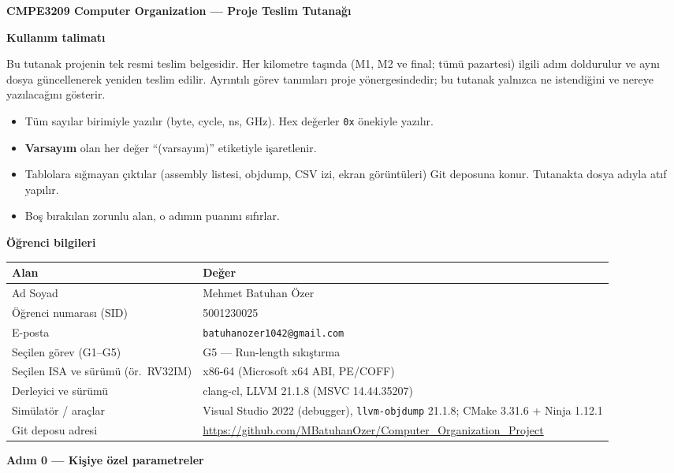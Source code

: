 \documentclass[11pt,a4paper]{article}
\newcommand{\tl}{\texttt}
\newcommand{\hd}[1]{\cellcolor{hdr}#1}
\begin{document}
\begin{center}
\textbf{CMPE3209 Computer Organization --- Proje Teslim Tutanağı}
\end{center}

\textbf{Kullanım talimatı}

Bu tutanak projenin tek resmi teslim belgesidir. Her kilometre taşında (M1, M2 ve final; tümü
pazartesi) ilgili adım doldurulur ve aynı dosya güncellenerek yeniden teslim edilir. Ayrıntılı
görev tanımları proje yönergesindedir; bu tutanak yalnızca ne istendiğini ve nereye yazılacağını
gösterir.

\begin{itemize}[leftmargin=2em,itemsep=1pt,topsep=2pt]
\item Tüm sayılar birimiyle yazılır (byte, cycle, ns, GHz). Hex değerler \tl{0x} önekiyle yazılır.
\item \textbf{Varsayım} olan her değer ``(varsayım)'' etiketiyle işaretlenir.
\item Tablolara sığmayan çıktılar (assembly listesi, objdump, CSV izi, ekran görüntüleri) Git
deposuna konur. Tutanakta dosya adıyla atıf yapılır.
\item Boş bırakılan zorunlu alan, o adımın puanını sıfırlar.
\end{itemize}

\textbf{Öğrenci bilgileri}

\begin{longtable}{|p{10.2cm}|p{5.3cm}|}
\hline
\hd{Alan} & \hd{Değer}\\
\hline
Ad Soyad & Mehmet Batuhan Özer\\
\hline
Öğrenci numarası (SID) & 5001230025\\
\hline
E-posta & \tl{batuhanozer1042@gmail.com}\\
\hline
Seçilen görev (G1--G5) & G5 --- Run-length sıkıştırma\\
\hline
Seçilen ISA ve sürümü (ör.\ RV32IM) & x86-64 (Microsoft x64 ABI, PE/COFF)\\
\hline
Derleyici ve sürümü & clang-cl, LLVM 21.1.8 (MSVC 14.44.35207)\\
\hline
Simülatör / araçlar & Visual Studio 2022 (debugger), \tl{llvm-objdump} 21.1.8; CMake 3.31.6 + Ninja 1.12.1\\
\hline
Git deposu adresi & \url{https://github.com/MBatuhanOzer/Computer_Organization_Project}\\
\hline
\end{longtable}

\textbf{Adım 0 --- Kişiye özel parametreler}
\end{document}
